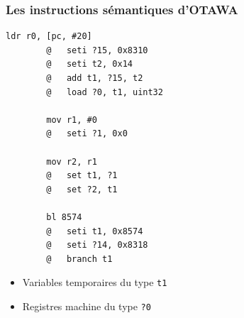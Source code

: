 \documentclass[table]{beamer}
\begin{document}


\begin{frame}[fragile]
    \frametitle{Les instructions sémantiques d'OTAWA}
    \begin{minipage}{.46\linewidth}
	\begin{lstlisting}[language={[ARM]Assembler}]
	    ldr r0, [pc, #20]
	    @	seti ?15, 0x8310
	    @	seti t2, 0x14
	    @	add t1, ?15, t2
	    @	load ?0, t1, uint32

	    mov r1, #0
	    @	seti ?1, 0x0

	    mov r2, r1
	    @	set t1, ?1
	    @	set ?2, t1

	    bl 8574
	    @	seti t1, 0x8574
	    @	seti ?14, 0x8318
	    @	branch t1
	\end{lstlisting}
    \end{minipage}
    \begin{minipage}{.46\linewidth}
	\begin{itemize}
	    \item Variables temporaires du type \texttt{t1}
	    \item Registres machine du type \texttt{?0}
	\end{itemize}
    \end{minipage}
\end{frame}
\end{document}
